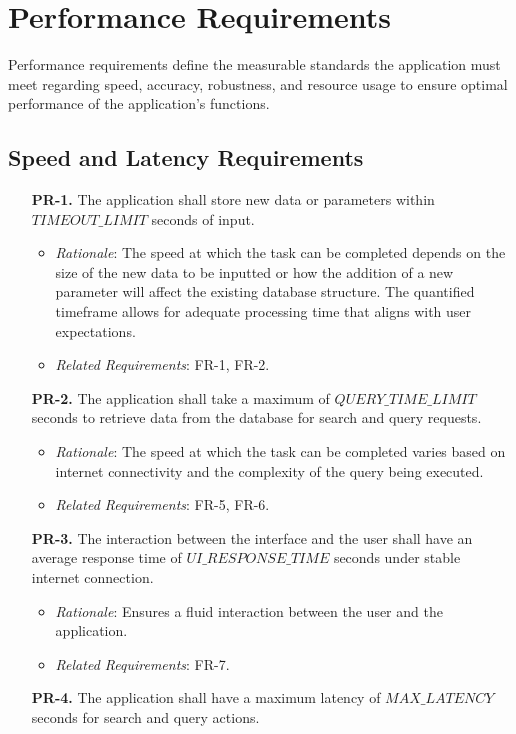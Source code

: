 \documentclass[12pt]{article}
\begin{document}
\section{Performance Requirements}
Performance requirements define the measurable standards the application must meet regarding speed, accuracy, robustness, and resource usage to ensure optimal performance of the application's functions.
\subsection{Speed and Latency Requirements}
\begin{enumerate}
\item[\textbf{PR-1.}] The application shall store new data or parameters within
\\ $TIMEOUT\_LIMIT$ seconds of input.
  \begin{itemize}
    \item \textit{Rationale}: The speed at which the task can be completed depends on the size of the new data to be inputted or how the addition of a new parameter will affect the existing database structure. The quantified timeframe allows for adequate processing time that aligns with user expectations.
    \item \textit{Related Requirements}: FR-1, FR-2.
  \end{itemize}
\item[\textbf{PR-2.}] The application shall take a maximum of $QUERY\_TIME\_LIMIT$
seconds to retrieve data from the database for search and query requests.
  \begin{itemize}
    \item \textit{Rationale}: The speed at which the task can be completed varies based on internet connectivity and the complexity of the query being executed.
    \item \textit{Related Requirements}: FR-5, FR-6.
  \end{itemize}
\item[\textbf{PR-3.}] The interaction between the interface and the user shall
have an average response time of $UI\_RESPONSE\_TIME$ seconds under stable
internet connection.
  \begin{itemize}
    \item \textit{Rationale}: Ensures a fluid interaction between the user and the application.
    \item \textit{Related Requirements}: FR-7.
  \end{itemize}
\item[\textbf{PR-4.}] The application shall have a maximum latency of $MAX\_LATENCY$ seconds for search and query actions.

\end{enumerate}
\end{document}
